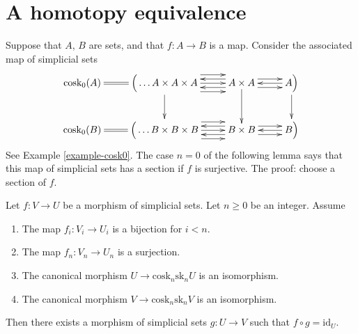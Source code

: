 \section{A homotopy equivalence}
\label{section-homotopy-equivalence}

\noindent
Suppose that $A$, $B$ are sets, and that $f : A \to B$
is a map. Consider the associated map of
simplicial sets
$$
\xymatrix{
\text{cosk}_0(A) \ar@{=}[r] &
\Big(
\ldots
A\times A \times A
\ar[d]
\ar@<2ex>[r]
\ar@<0ex>[r]
\ar@<-2ex>[r]
&
A \times A
\ar[d]
\ar@<1ex>[r]
\ar@<-1ex>[r]
\ar@<1ex>[l]
\ar@<-1ex>[l]
&
A
\ar[d]
\ar@<0ex>[l]
\Big)
\\
\text{cosk}_0(B) \ar@{=}[r] &
\Big(
\ldots
B\times B \times B
\ar@<2ex>[r]
\ar@<0ex>[r]
\ar@<-2ex>[r]
&
B \times B
\ar@<1ex>[r]
\ar@<-1ex>[r]
\ar@<1ex>[l]
\ar@<-1ex>[l]
&
B
\ar@<0ex>[l]
\Big)
}
$$
See Example \ref{example-cosk0}.
The case $n = 0$ of the following lemma
says that this map of simplicial sets
has a section if $f$ is surjective.
The proof: choose a section of $f$.

\begin{lemma}
\label{lemma-section}
Let $f : V \to U$ be a morphism of simplicial sets.
Let $n \geq 0$ be an integer.
Assume
\begin{enumerate}
\item The map $f_i : V_i \to U_i$ is a bijection for $i < n$.
\item The map $f_n : V_n \to U_n$ is a surjection.
\item The canonical morphism $U \to \text{cosk}_n \text{sk}_n U$
is an isomorphism.
\item The canonical morphism $V \to \text{cosk}_n \text{sk}_n V$
is an isomorphism.
\end{enumerate}
Then there exists a morphism of simplicial sets $g : U \to V$
such that $f \circ g = \text{id}_U$.
\end{lemma}

